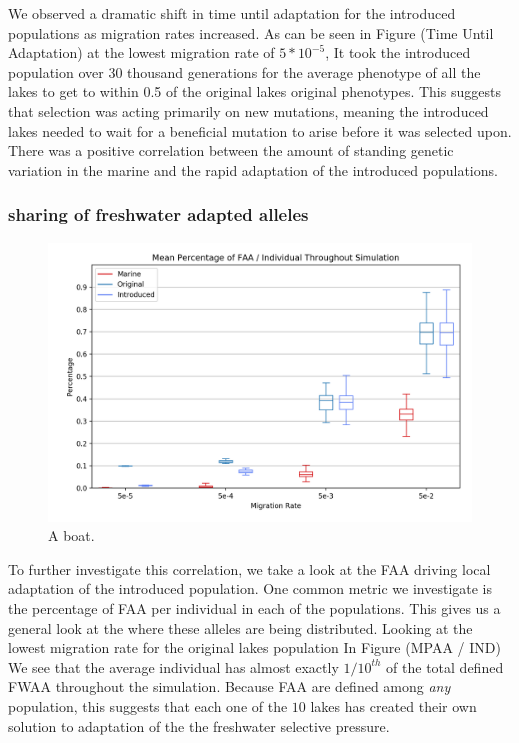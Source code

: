 \documentclass{article}
\begin{document}
We observed a dramatic shift in time until adaptation for the introduced populations
as migration rates increased. 
As can be seen in Figure (Time Until Adaptation) at the lowest migration rate of $5 * 10^{-5}$,
It took the introduced population over 30 thousand generations for the average phenotype of all the lakes to 
get to within 0.5 of the original lakes original phenotypes. 
This suggests that selection was acting primarily on new mutations, meaning the 
introduced lakes needed to wait for a beneficial mutation to arise before 
it was selected upon. 
There was a positive correlation between the amount of standing genetic variation in the 
marine and the rapid adaptation of the introduced populations.

 
\subsubsection*{sharing of freshwater adapted alleles}

\begin{figure}[h!tb]
	\begin{center}
  		\includegraphics[width=0.8\linewidth]{matplotlib/MPFAI.png}
  		\caption{A boat.}
  		\label{fig:boat2}
	\end{center}
\end{figure}

To further investigate this correlation, we take a look at the FAA driving 
local adaptation of the introduced population. 
One common metric we investigate is the percentage of FAA per individual in each of the populations. 
This gives us a general look at the where these alleles are being distributed. 
Looking at the lowest migration rate for the original lakes population In Figure (MPAA / IND) 
We see that the average individual has almost exactly $1/10^{th}$ of the total defined FWAA throughout the simulation. 
Because FAA are defined among \textit{any} population, this suggests that each one of the $10$ 
lakes has created their own solution to adaptation of the the freshwater selective pressure. 
\end{document}
